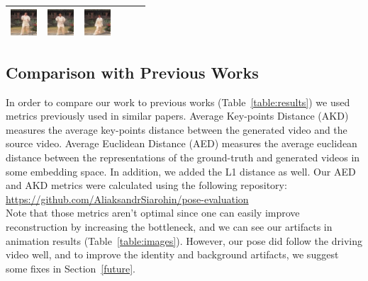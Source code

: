 \documentclass{article}
\begin{document}
\begin{table}[t]
\begin{center}
\begin{small}
\begin{sc}
\begin{tabular}{m{1.0cm}m{1.0cm}m{1.0cm}m{1.0cm}m{1.0cm}m{1.0cm}}
\includegraphics[width=1cm, height=1cm]{images/softmax/04.png} &
\includegraphics[width=1cm, height=1cm]{images/softmax/05.png} &
\includegraphics[width=1cm, height=1cm]{images/softmax/06.png} \\
\bottomrule
\end{tabular}
\end{sc}
\end{small}
\end{center}
\vskip -0.1in
\end{table}

\subsection{Comparison with Previous Works}
In order to compare our work to previous works (Table~\ref{table:results})
we used metrics previously used in similar papers.
Average Key-points Distance \cite{cao2017realtime} (AKD)
measures the average key-points distance between the generated video and
the source video. Average Euclidean Distance \cite{zheng2019joint} (AED)
measures the average euclidean distance
 between the representations of the ground-truth and generated videos in
 some embedding space. In addition, we added the L1 distance as well.
 Our AED and AKD metrics were calculated using the following repository:
 \url{https://github.com/AliaksandrSiarohin/pose-evaluation}
\\
Note that those metrics aren't optimal since one can easily improve
reconstruction by increasing the bottleneck, and we can see our
artifacts in animation results (Table~\ref{table:images}).
However, our pose did follow the driving video well, and to improve the
identity and background artifacts, we suggest some fixes in Section~\ref{future}.

\end{document}
